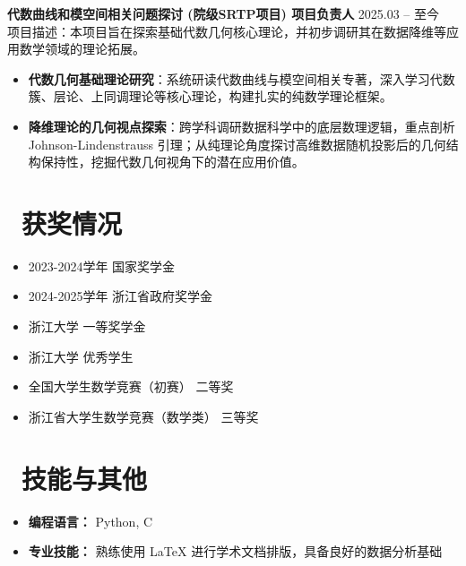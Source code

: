 \documentclass[11pt]{article}
\newlength{\interProjectSpacing}
\newcommand{\projectsep}{\vspace{\interProjectSpacing}}
\newlength{\intraProjectTitleSep}
\newcommand{\titlebreak}{\\[\intraProjectTitleSep]}
\newlength{\intraProjectListTopSep}
\begin{document}
\projectsep

\textbf{代数曲线和模空间相关问题探讨 (院级SRTP项目) \quad 项目负责人} \hfill 2025.03 -- 至今 \titlebreak
项目描述：本项目旨在探索基础代数几何核心理论，并初步调研其在数据降维等应用数学领域的理论拓展。
\begin{itemize}[nosep, topsep=\intraProjectListTopSep]
    \item \textbf{代数几何基础理论研究}：系统研读代数曲线与模空间相关专著，深入学习代数簇、层论、上同调理论等核心理论，构建扎实的纯数学理论框架。
    \item \textbf{降维理论的几何视点探索}：跨学科调研数据科学中的底层数理逻辑，重点剖析 Johnson-Lindenstrauss 引理；从纯理论角度探讨高维数据随机投影后的几何结构保持性，挖掘代数几何视角下的潜在应用价值。
\end{itemize}

\section{\makebox[\widthof{\faList}][c]{\color{CVBlue}\faList}\ 获奖情况}
\begin{itemize}[parsep=0.5ex]
    \item 2023-2024学年 国家奖学金
    \item 2024-2025学年 浙江省政府奖学金
    \item 浙江大学 一等奖学金
    \item 浙江大学 优秀学生
    \item 全国大学生数学竞赛（初赛） 二等奖
    \item 浙江省大学生数学竞赛（数学类） 三等奖
\end{itemize}
    
\section{\makebox[\widthof{\faCogs}][c]{\color{CVBlue}\faCogs}\ 技能与其他}
\begin{itemize}[nosep]
    \item \textbf{编程语言：} Python, C
    \item \textbf{专业技能：} 熟练使用 LaTeX 进行学术文档排版，具备良好的数据分析基础
\end{itemize}
\end{document}
